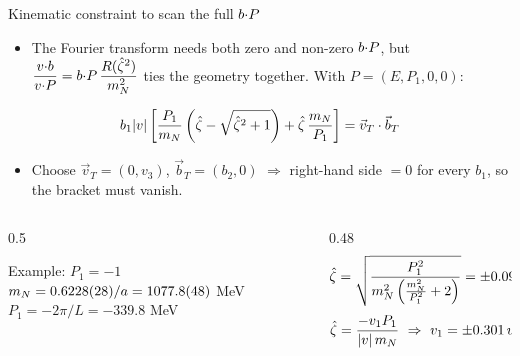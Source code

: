 \begin{frame}{Kinematic constraint to scan the full $b{\cdot} P$}
  \begin{itemize}
    \item The Fourier transform needs both zero and non-zero $b {\cdot} P$, but $\dfrac{v {\cdot} b}{v {\cdot} P} = b {\cdot} P\, \dfrac{R({\hat \zeta}^2)}{m_N^2}$ ties the geometry together. With $P = (E, P_1, 0, 0)$:
  \end{itemize}
  \[ b_{1}|v|\left[\frac{P_{1}}{m_N}\left({\hat \zeta}-\sqrt{{\hat \zeta}^2+1}\right)+{\hat \zeta}\,\frac{m_N}{P_{1}}\right]=\vec{v}_{T}\cdot\vec{b}_{T} \]
  \begin{itemize}
    \item Choose $\vec{v}_{T}=(0,v_{3})$, $\vec{b}_{T}=(b_{2},0)$ $\Rightarrow$ right-hand side $=0$ for every $b_1$, so the bracket must vanish.
  \end{itemize}
  \begin{columns}[t]
    \begin{column}{0.5\textwidth}
      \begin{block}{Example: $P_1=-1$}
        \small
        $m_N = 0.6228(28)/a = 1077.8(48)$ MeV\\
        $P_1=-2\pi/L=-339.8$ MeV
      \end{block}
    \end{column}
    \begin{column}{0.48\textwidth}
      \small
      \[ {\hat \zeta} =\sqrt{\frac{P_{1}^2}{m_N^{2}\left(\frac{m_N^{2}}{P_{1}^{2}}+2\right)}} = \pm 0.090772 \]
      \[ \zetahat=\frac{-v_{1}P_{1}}{|v|\,\mN} \ \Rightarrow\ v_{1}=\pm 0.301\,v_{3} \]
    \end{column}
  \end{columns}
\end{frame}

